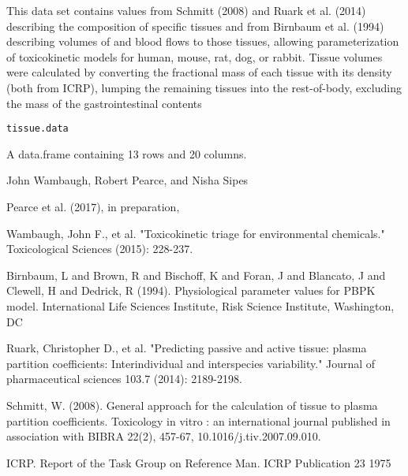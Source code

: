 \documentclass[a4paper]{book}
\begin{document}
%
\begin{Description}\relax
This data set contains values from Schmitt (2008) and Ruark et al. (2014)
describing the composition of specific tissues and from Birnbaum et al.
(1994) describing volumes of and blood flows to those tissues, allowing
parameterization of toxicokinetic models for human, mouse, rat, dog, or
rabbit. Tissue volumes were calculated by converting the fractional mass of
each tissue with its density (both from ICRP), lumping the remaining tissues
into the rest-of-body, excluding the mass of the gastrointestinal contents
\end{Description}
%
\begin{Usage}
\begin{verbatim}
tissue.data
\end{verbatim}
\end{Usage}
%
\begin{Format}
A data.frame containing 13 rows and 20 columns.
\end{Format}
%
\begin{Author}\relax
John Wambaugh, Robert Pearce, and Nisha Sipes
\end{Author}
%
\begin{Source}\relax
Pearce et al. (2017), in preparation,

Wambaugh, John F., et al. "Toxicokinetic triage for environmental
chemicals." Toxicological Sciences (2015): 228-237.
\end{Source}
%
\begin{References}\relax
Birnbaum, L and Brown, R and Bischoff, K and Foran, J and
Blancato, J and Clewell, H and Dedrick, R (1994). Physiological parameter
values for PBPK model. International Life Sciences Institute, Risk Science
Institute, Washington, DC

Ruark, Christopher D., et al. "Predicting passive and active tissue: plasma
partition coefficients: Interindividual and interspecies variability."
Journal of pharmaceutical sciences 103.7 (2014): 2189-2198.

Schmitt, W. (2008). General approach for the calculation of tissue to plasma
partition coefficients. Toxicology in vitro : an international journal
published in association with BIBRA 22(2), 457-67,
10.1016/j.tiv.2007.09.010.

ICRP. Report of the Task Group on Reference Man. ICRP Publication 23 1975
\end{References}
\end{document}
